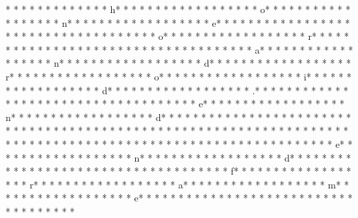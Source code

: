 *  * * *  *  * * *  *  * * *  * h* * *  * * *  * * *  *  * * *  *  * * *  * o* * *  * * *  * * *  *  * * *  *  * * *  * n* * *  * * *  * * *  *  * * *  *  * * *  * e* * *  * * *  * * *  *  * * *  *  * * *  *  * * *  * * *  * * *  *  * * *  *  * * *  * o* * *  * * *  * * *  *  * * *  *  * * *  * r* * *  * * *  * * *  *  * * *  *  * * *  *  * * *  * * *  * * *  *  * * *  *  * * *  * a* * *  * * *  * * *  *  * * *  *  * * *  * n* * *  * * *  * * *  *  * * *  *  * * *  * d* * *  * * *  * * *  *  * * *  *  * * *  * r* * *  * * *  * * *  *  * * *  *  * * *  * o* * *  * * *  * * *  *  * * *  *  * * *  * i* * *  * * *  * * *  *  * * *  *  * * *  * d* * *  * * *  * * *  *  * * *  *  * * *  * .* * *  * * *  * * *  *  * * *  *  * * *  * 
* * *  * * *  * * *  *  * * *  *  * * *  * e* * *  * * *  * * *  *  * * *  *  * * *  * n* * *  * * *  * * *  *  * * *  *  * * *  * d* * *  * * *  * * *  *  * * *  *  * * *  * {* * *  * * *  * * *  *  * * *  *  * * *  *  * * *  * * *  * * *  *  * * *  *  * * *  * }* * *  * * *  * * *  *  * * *  *  * * *  * 
* * *  * * *  * * *  *  * * *  *  * * *  * 
* * *  * * *  * * *  *  * * *  *  * * *  * e* * *  * * *  * * *  *  * * *  *  * * *  * n* * *  * * *  * * *  *  * * *  *  * * *  * d* * *  * * *  * * *  *  * * *  *  * * *  * {* * *  * * *  * * *  *  * * *  *  * * *  * f* * *  * * *  * * *  *  * * *  *  * * *  * r* * *  * * *  * * *  *  * * *  *  * * *  * a* * *  * * *  * * *  *  * * *  *  * * *  * m* * *  * * *  * * *  *  * * *  *  * * *  * e* * *  * * *  * * *  *  * * *  *  * * *  * }* * *  * * *  * * *  *  * * *  *  * * *  * 
